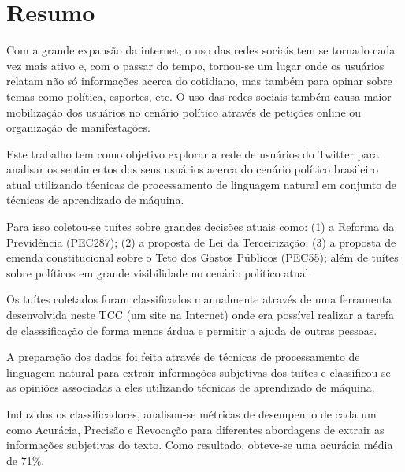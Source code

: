 \chapter*{Resumo}

Com a grande expansão da internet, o uso das redes sociais tem se
tornado cada vez mais ativo e, com o passar do tempo, tornou-se um
lugar onde os usuários relatam não só informações acerca do cotidiano,
mas também para opinar sobre temas como política, esportes, etc. O uso
 das redes sociais também causa maior mobilização dos usuários no
cenário político através de petições online ou organização de
manifestações.

Este trabalho tem como objetivo explorar a rede de usuários do Twitter
para analisar os sentimentos dos seus usuários acerca do cenário
político brasileiro atual utilizando técnicas de processamento de
linguagem natural em conjunto de técnicas de aprendizado de máquina.

Para isso coletou-se tuítes sobre grandes decisões atuais como: (1) a
Reforma da Previdência (PEC287); (2) a proposta de Lei da
Terceirização; (3) a proposta de emenda constitucional sobre o Teto
dos Gastos Públicos (PEC55); além de tuítes sobre políticos em grande
visibilidade no cenário político atual.

Os tuítes coletados foram classificados manualmente através de uma
ferramenta desenvolvida neste TCC (um site na Internet) onde era
possível realizar a tarefa de classsificação de forma menos árdua e
permitir a ajuda de outras pessoas.

A preparação dos dados foi feita através de técnicas de processamento
de linguagem natural para extrair informações subjetivas dos tuítes e
classificou-se as opiniões associadas a eles utilizando técnicas de
aprendizado de máquina.

Induzidos os classificadores, analisou-se métricas de desempenho de
cada um como Acurácia, Precisão e Revocação para diferentes abordagens
de extrair as informações subjetivas do texto.
Como resultado, obteve-se uma acurácia média de 71\%.

